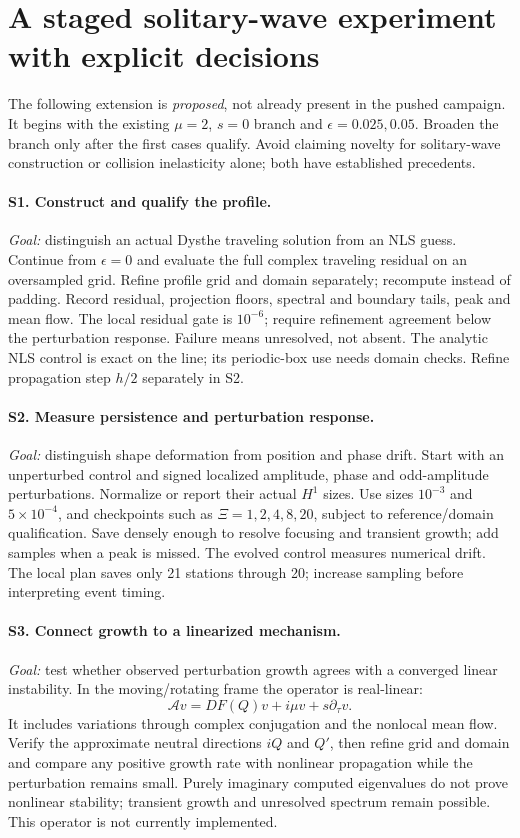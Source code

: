 \documentclass[11pt]{article}
\begin{document}
\newpage
\section{A staged solitary-wave experiment with explicit decisions}
The following extension is \emph{proposed}, not already present in the pushed
campaign. It begins with the existing $\mu=2$, $s=0$ branch and
$\epsilon=0.025,0.05$. Broaden the branch only after the first cases qualify.
Avoid claiming novelty for solitary-wave construction or collision inelasticity
alone; both have established precedents.

\paragraph{S1. Construct and qualify the profile.}
\emph{Goal:} distinguish an actual Dysthe traveling solution from an NLS guess.
Continue from $\epsilon=0$ and evaluate the full complex traveling residual on an
oversampled grid. Refine profile grid and domain separately; recompute instead
of padding. Record residual, projection floors, spectral and boundary tails,
peak and mean flow. The local residual gate is $10^{-6}$; require refinement
agreement below the perturbation response. Failure means unresolved, not absent.
The analytic NLS control is exact on the line; its periodic-box use needs domain
checks. Refine propagation step $h/2$ separately in S2.

\paragraph{S2. Measure persistence and perturbation response.}
\emph{Goal:} distinguish shape deformation from position and phase drift.
Start with an unperturbed control and signed localized amplitude, phase and
odd-amplitude perturbations. Normalize or report their actual $H^1$ sizes.
Use sizes $10^{-3}$ and $5\times10^{-4}$, and checkpoints such as
$\Xi=1,2,4,8,20$, subject to reference/domain qualification. Save densely enough
to resolve focusing and transient growth; add samples when a peak is missed.
The evolved control measures numerical drift. The local plan saves only 21
stations through 20; increase sampling before interpreting event timing.

\paragraph{S3. Connect growth to a linearized mechanism.}
\emph{Goal:} test whether observed perturbation growth agrees with a converged
linear instability. In the moving/rotating frame the operator is real-linear:
\[
\mathcal A v=DF(Q)v+i\mu v+s\partial_\tau v.
\]
It includes variations through complex conjugation and the nonlocal mean flow.
Verify the approximate neutral directions $iQ$ and $Q'$, then refine grid and
domain and compare any positive growth rate with nonlinear propagation while
the perturbation remains small. Purely imaginary computed eigenvalues do not
prove nonlinear stability; transient growth and unresolved spectrum remain
possible. This operator is not currently implemented.
\end{document}
